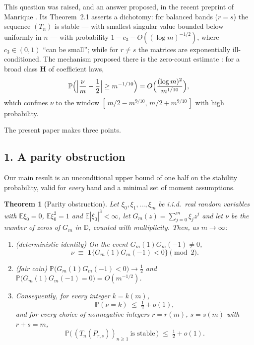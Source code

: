 \documentclass[11pt]{article}
\newtheorem{theorem}{Theorem}[section]
\newcommand{\D}{\mathbb{D}}
\newcommand{\E}{\mathbb{E}}
\newcommand{\PP}{\mathbb{P}}
\begin{document}
This question was raised, and an answer proposed, in the recent preprint of
Manrique \cite{Manrique}.  Its Theorem~2.1 asserts a dichotomy: for balanced
bands ($r=s$) the sequence $(T_n)$ is stable --- with smallest singular value
bounded below uniformly in $n$ --- with probability $1-c_3-O((\log m)^{-1/2})$,
where $c_3\in(0,1)$ ``can be small''; while for $r\ne s$ the matrices are
exponentially ill-conditioned.  The mechanism proposed there is the zero-count
estimate \cite[Theorem~3.1]{Manrique}: for a broad class $\mathbf H$ of
coefficient laws,
\begin{equation}\label{eq:window}
\PP\Bigl(\Bigl|\frac{\nu}{m}-\frac12\Bigr|\ge m^{-1/10}\Bigr)
=O\Bigl(\frac{(\log m)^2}{m^{1/10}}\Bigr),
\end{equation}
which confines $\nu$ to the window $[\,m/2-m^{9/10},\,m/2+m^{9/10}\,]$ with high
probability.

The present paper makes three points.

\subsection*{1.  A parity obstruction}

Our main result is an unconditional upper bound of one half on the stability
probability, valid for \emph{every} band and a minimal set of moment
assumptions.

\begin{theorem}[Parity obstruction]\label{thm:parity}
Let $\xi_0,\xi_1,\dots,\xi_m$ be i.i.d.\ real random variables with
$\E\xi_0=0$, $\E\xi_0^2=1$ and $\E|\xi_0|^3<\infty$, let
$G_m(z)=\sum_{j=0}^m\xi_jz^j$ and let $\nu$ be the number of zeros of $G_m$ in
$\D$, counted with multiplicity.  Then, as $m\to\infty$:
\begin{enumerate}
\item[(i)] {\rm(deterministic identity)}  On the event $G_m(1)G_m(-1)\ne0$,
\[
\nu\;\equiv\;\mathbf 1\{G_m(1)G_m(-1)<0\}\pmod 2 .
\]
\item[(ii)] {\rm(fair coin)}
$\PP\bigl(G_m(1)G_m(-1)<0\bigr)\longrightarrow\tfrac12$ and
$\PP\bigl(G_m(1)G_m(-1)=0\bigr)=O(m^{-1/2})$.
\item[(iii)] Consequently, for every integer $k=k(m)$,
\[
\PP(\nu=k)\;\le\;\tfrac12+o(1),
\]
and for every choice of nonnegative integers $r=r(m)$, $s=s(m)$ with $r+s=m$,
\[
\PP\bigl(\,(T_n(P_{r,s}))_{n\ge1}\ \text{is stable}\,\bigr)\;\le\;\tfrac12+o(1).
\]
\end{enumerate}
\end{theorem}
\end{document}
